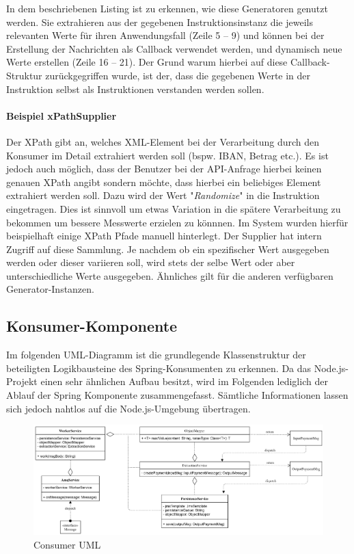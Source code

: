 In dem beschriebenen Listing ist zu erkennen, wie diese Generatoren genutzt werden. Sie extrahieren aus der gegebenen Instruktionsinstanz die jeweils relevanten Werte für ihren Anwendungsfall (Zeile 5 -- 9) und können bei der Erstellung der Nachrichten als Callback verwendet werden, und dynamisch neue Werte erstellen (Zeile 16 -- 21). Der Grund warum hierbei auf diese Callback-Struktur zurückgegriffen wurde, ist der, dass die gegebenen Werte in der Instruktion selbst als Instruktionen verstanden werden sollen.
\paragraph{Beispiel xPathSupplier} 
Der XPath gibt an, welches XML-Element bei der Verarbeitung durch den Konsumer im Detail extrahiert werden soll (bspw. IBAN, Betrag etc.). Es ist jedoch auch möglich, dass der Benutzer bei der API-Anfrage hierbei keinen genauen XPath angibt sondern möchte, dass hierbei ein beliebiges Element extrahiert werden soll. Dazu wird der Wert "\emph{Randomize}" in die Instruktion eingetragen. Dies ist sinnvoll um etwas Variation in die spätere Verarbeitung zu bekommen um bessere Messwerte erzielen zu könnnen. Im System wurden hierfür beispielhaft einige XPath Pfade manuell hinterlegt. Der Supplier hat intern Zugriff auf diese Sammlung. Je nachdem ob ein spezifischer Wert ausgegeben werden oder dieser variieren soll, wird stets der selbe Wert oder aber unterschiedliche Werte ausgegeben. Ähnliches gilt für die anderen verfügbaren Generator-Instanzen.

\subsection{Konsumer-Komponente \checkmark}

Im folgenden UML-Diagramm ist die grundlegende Klassenstruktur der beteiligten Logikbausteine des Spring-Konsumenten zu erkennen. Da das Node.js-Projekt einen sehr ähnlichen Aufbau besitzt, wird im Folgenden lediglich der Ablauf der Spring Komponente zusammengefasst. Sämtliche Informationen lassen sich jedoch nahtlos auf die Node.js-Umgebung übertragen. 

\begin{figure}[ht!]
	\centering
	\includegraphics[width=\linewidth]{kapitel/problemloesung/implementierung/_img/consumer-uml}
	\caption[Consumer UML]{Consumer UML}
	\label{fig:consumerUml}
\end{figure}

